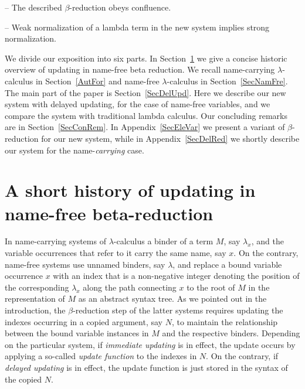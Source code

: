 \documentclass{article}
\theoremstyle{plain}
\theoremstyle{definition}
\begin{document}
-- The described $\beta$-reduction obeys confluence.

-- Weak normalization of a lambda term in the new system implies strong normalization.

\smallskip


We divide our exposition into six parts. In Section~\ref{SecShoHis} we give %
a concise historic overview of updating in name-free beta reduction.
We recall name-carrying $\lambda$-calculus in Section~\ref{AutFor} %
and name-free $\lambda$-calculus in Section~\ref{SecNamFre}. The main part of the paper is Section~\ref{SecDelUpd}. Here we describe our new system with delayed updating, for the case of name-free variables, and we compare the system with traditional lambda calculus.
Our concluding remarks are in Section~\ref{SecConRem}. %
In Appendix~\ref{SecEleVar} %
we present a variant of $\beta$-reduction for our new system,
while in Appendix~\ref{SecDelRed} %
we shortly describe our system for the name-{\em carrying\/} case.




\section{A short history of updating in name-free beta-reduction}\label{SecShoHis}

In name-carrying systems of $\lambda$-calculus
a binder of a term $M$, say $\lambda_x$, and the variable occurrences
that refer to it carry the same name, say $x$.
On the contrary, name-free systems use unnamed binders, say $\lambda$,
and replace a bound variable occurrence $x$
with an index that is a non-negative integer denoting the position of
the corresponding $\lambda_x$ along the path connecting $x$ to the
root of $M$ in the representation of $M$ as an abstract syntax tree.
As we pointed out in the introduction,
the $\beta$-reduction step of the latter systems
requires updating the indexes occurring in a copied
argument, say $N$, to maintain the relationship between the bound variable
instances in $M$ and the respective binders.
Depending on the particular system,
if {\em immediate updating\/} is in effect, the update occurs by
applying a so-called {\em update function\/} to the indexes in $N$. On the
contrary, if {\em delayed updating\/} is in effect, the update function
is just stored in the syntax  of the copied $N$.
\end{document}
